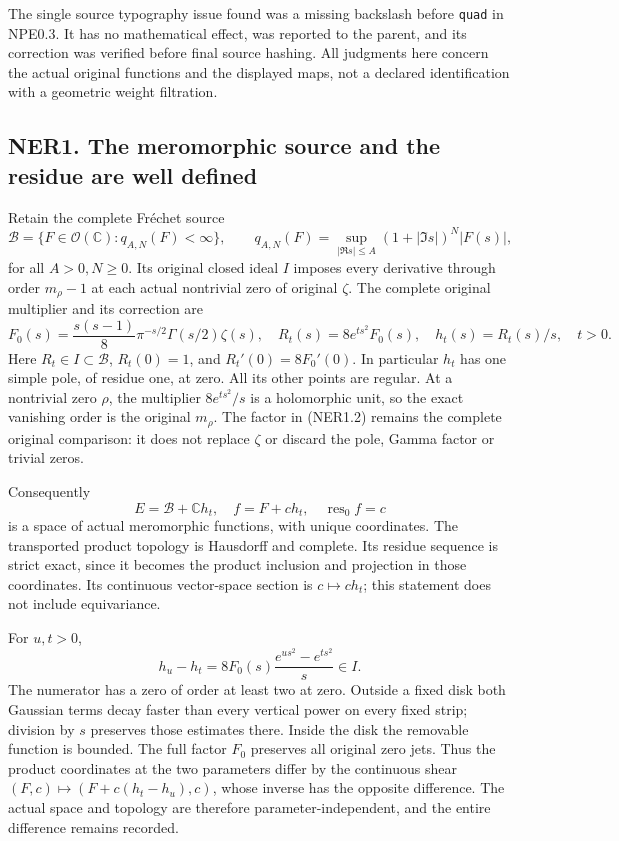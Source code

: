 The single source typography issue found was a missing backslash before
\texttt{quad} in NPE0.3. It has no mathematical effect, was reported to
the parent, and its correction was verified before final source hashing.
All judgments here concern the actual original functions and the
displayed maps, not a declared identification with a geometric weight
filtration.

\subsection{NER1. The meromorphic source and the residue are well
defined}\label{ner1.-the-meromorphic-source-and-the-residue-are-well-defined}

Retain the complete Fréchet source \[
\mathcal B=\{F\in\mathcal O(\mathbb C):q_{A,N}(F)<\infty\},
\qquad q_{A,N}(F)=\sup_{|\Re s|\le A}(1+|\Im s|)^N|F(s)|,
\tag{NER1.1}
\] for all \(A>0,N\ge0\). Its original closed ideal \(I\) imposes every
derivative through order \(m_\rho-1\) at each actual nontrivial zero of
original \(\zeta\). The complete original multiplier and its correction
are \[
F_0(s)=\frac{s(s-1)}8\pi^{-s/2}\Gamma(s/2)\zeta(s),\quad
R_t(s)=8e^{ts^2}F_0(s),\quad h_t(s)=R_t(s)/s,
\quad t>0.
\tag{NER1.2}
\] Here \(R_t\in I\subset\mathcal B\), \(R_t(0)=1\), and
\(R_t'(0)=8F_0'(0)\). In particular \(h_t\) has one simple pole, of
residue one, at zero. All its other points are regular. At a nontrivial
zero \(\rho\), the multiplier \(8e^{ts^2}/s\) is a holomorphic unit, so
the exact vanishing order is the original \(m_\rho\). The factor in
(NER1.2) remains the complete original comparison: it does not replace
\(\zeta\) or discard the pole, Gamma factor or trivial zeros.

Consequently \[
E=\mathcal B+\mathbb C h_t,\quad f=F+ch_t,
\quad\operatorname{res}_0 f=c
\tag{NER1.3}
\] is a space of actual meromorphic functions, with unique coordinates.
The transported product topology is Hausdorff and complete. Its residue
sequence is strict exact, since it becomes the product inclusion and
projection in those coordinates. Its continuous vector-space section is
\(c\mapsto ch_t\); this statement does not include equivariance.

For \(u,t>0\), \[
h_u-h_t=8F_0(s)\frac{e^{us^2}-e^{ts^2}}s\in I.
\tag{NER1.4}
\] The numerator has a zero of order at least two at zero. Outside a
fixed disk both Gaussian terms decay faster than every vertical power on
every fixed strip; division by \(s\) preserves those estimates there.
Inside the disk the removable function is bounded. The full factor
\(F_0\) preserves all original zero jets. Thus the product coordinates
at the two parameters differ by the continuous shear
\((F,c)\mapsto(F+c(h_t-h_u),c)\), whose inverse has the opposite
difference. The actual space and topology are therefore
parameter-independent, and the entire difference remains recorded.

